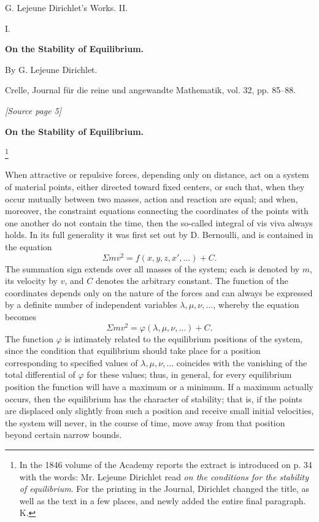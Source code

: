 \documentclass[11pt]{article}
\newcommand{\sourcepage}[1]{\par\smallskip\noindent\textit{[Source page #1]}\par\smallskip}
\begin{document}
\begin{center}
{\Large G. Lejeune Dirichlet's Works. II.}\par\vspace{1.5em}
{\Large I.}\par\vspace{0.5em}
{\LARGE \textbf{On the Stability of Equilibrium.}}\par\vspace{1em}
{\large By G. Lejeune Dirichlet.}\par\vspace{0.5em}
{\small Crelle, Journal für die reine und angewandte Mathematik, vol. 32, pp. 85--88.}
\end{center}

\sourcepage{5}

\begin{center}
\textbf{On the Stability of Equilibrium.}
\end{center}

\footnote{In the 1846 volume of the Academy reports the extract is introduced on p. 34 with the words: Mr. Lejeune Dirichlet read \emph{on the conditions for the stability of equilibrium}. For the printing in the Journal, Dirichlet changed the title, as well as the text in a few places, and newly added the entire final paragraph. K.}

When attractive or repulsive forces, depending only on distance, act on a system of material points, either directed toward fixed centers, or such that, when they occur mutually between two masses, action and reaction are equal; and when, moreover, the constraint equations connecting the coordinates of the points with one another do not contain the time, then the so-called integral of vis viva always holds. In its full generality it was first set out by D. Bernoulli, and is contained in the equation
\[
\Sigma m v^2 = f(x,y,z,x',\ldots)+C.
\]
The summation sign extends over all masses of the system; each is denoted by $m$, its velocity by $v$, and $C$ denotes the arbitrary constant. The function of the coordinates depends only on the nature of the forces and can always be expressed by a definite number of independent variables $\lambda,\mu,\nu,\ldots$, whereby the equation becomes
\[
\Sigma m v^2 = \varphi(\lambda,\mu,\nu,\ldots)+C.
\]
The function $\varphi$ is intimately related to the equilibrium positions of the system, since the condition that equilibrium should take place for a position corresponding to specified values of $\lambda,\mu,\nu,\ldots$ coincides with the vanishing of the total differential of $\varphi$ for these values; thus, in general, for every equilibrium position the function will have a maximum or a minimum. If a maximum actually occurs, then the equilibrium has the character of stability; that is, if the points are displaced only slightly from such a position and receive small initial velocities, the system will never, in the course of time, move away from that position beyond certain narrow bounds.
\end{document}
